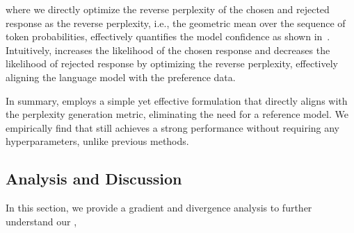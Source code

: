 where we directly optimize the reverse perplexity of the chosen and rejected response as the 
reverse perplexity, i.e., the geometric mean over the sequence of token probabilities, effectively quantifies the model confidence as shown in~\citep{valentin2024cost,liu2024litcab}. Intuitively, \method increases the likelihood of the chosen response and decreases the likelihood of rejected response by optimizing the reverse perplexity, effectively aligning the language model with the preference data.


In summary, \method employs a simple yet effective formulation that directly aligns with the perplexity generation metric, eliminating the need for a reference model. We empirically find that \method still achieves a strong performance without requiring any hyperparameters, unlike previous methods.





\subsection{Analysis and Discussion}
In this section, we provide a gradient and divergence analysis to further understand our \method, 

